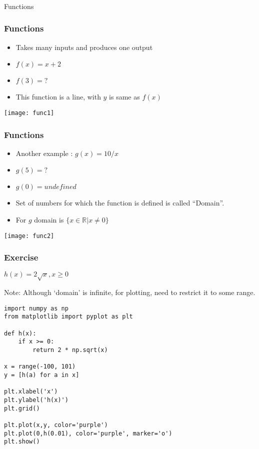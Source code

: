 \begin{frame}[fragile]\frametitle{}
\begin{center}
{\Large Functions}
\end{center}
\end{frame}

 \begin{frame}[fragile]\frametitle{Functions}
\begin{itemize}
\item Takes many inputs and produces one output
\item $f(x) = x + 2$
\item $f(3)=?$
\item This function is a line, with $y$ is same as $f(x)$
\end{itemize}
\begin{center}
\texttt{[image: func1]}
\end{center}
\end{frame}

 \begin{frame}[fragile]\frametitle{Functions}
\begin{itemize}
\item Another example : $g(x) = 10/x$
\item $g(5)=?$
\item $g(0)=undefined$
\item Set of numbers for which the function is defined is called ``Domain''.
\item For $g$ domain is $\{x \in \mathbb{R} | x \neq 0\}$
\end{itemize}
\begin{center}
\texttt{[image: func2]}
\end{center}
\end{frame}

 \begin{frame}[fragile]\frametitle{Exercise}
$h(x) = 2 \sqrt{x}, x \geq 0$

Note: Although `domain' is infinite, for plotting, need to restrict it to some range.


\begin{lstlisting}
import numpy as np
from matplotlib import pyplot as plt

def h(x):
    if x >= 0:
        return 2 * np.sqrt(x)

x = range(-100, 101)
y = [h(a) for a in x]

plt.xlabel('x')
plt.ylabel('h(x)')
plt.grid()

plt.plot(x,y, color='purple')
plt.plot(0,h(0.01), color='purple', marker='o')
plt.show()
\end{lstlisting}
\end{frame}

